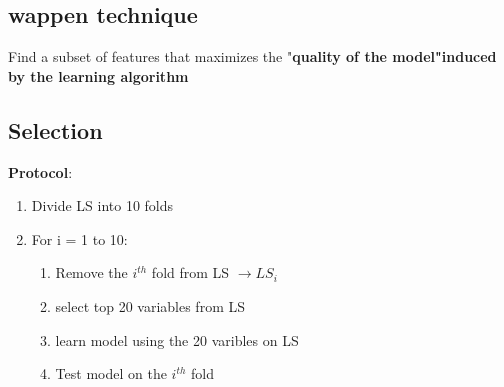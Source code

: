 \subsection{wappen technique}
Find a subset of features that maximizes the "\textbf{quality of the model"induced by the learning algorithm}



\subsection{Selection \biais}
\textbf{Protocol}:
\begin{enumerate}
    \item Divide LS into 10 folds
    \item  For i = 1 to 10: 
    \begin{enumerate}
        \item Remove the $i^{th}$ fold from LS $\to LS_i$
        \item select top 20 variables from LS
        \item learn model using the 20 varibles on LS 
        \item Test model on the $i^{th}$ fold 
    \end{enumerate}
\end{enumerate}